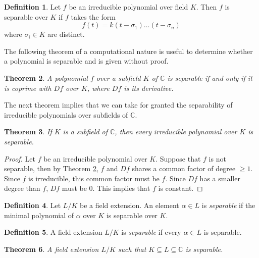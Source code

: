 \documentclass[12pt]{article}
\newtheorem{theorem}{Theorem}
\theoremstyle{definition}
\newtheorem{definition}[theorem]{Definition}
\newcommand{\C}{\mathbb C}
\begin{document}
\begin{definition}
    Let $f$ be an irreducible polynomial over field $K$. Then $f$ is separable over $K$ if $f$ takes the form 
    $$
        f(t) = k(t - \sigma_1) \dots (t - \sigma_n)
    $$
    where $\sigma_i \in \overline K$ are distinct.
\end{definition}

The following theorem of a computational nature is useful to determine whether a polynomial is separable and is given without proof. 

\begin{theorem} \label{thm:separable-derivative}
    A polynomial $f$ over a subfield $K$ of $\C$ is separable if and only if it is coprime with $Df$ over $K$, where $Df$ is its derivative. 
\end{theorem}

The next theorem implies that we can take for granted the separability of irreducible polynomials over subfields of $\C$. 

\begin{theorem} \label{thm:separable-poly-in-C}
    If $K$ is a subfield of $\C$, then every irreducible polynomial over $K$ is separable. 
\end{theorem}

\begin{proof}
    Let $f$ be an irreducible polynomial over $K$. Suppose that $f$ is not separable, then by Theorem \ref{thm:separable-derivative}, $f$ and $Df$ shares a common factor of degree $\ge 1$. Since $f$ is irreducible, this common factor must be $f$. Since $Df$ has a smaller degree than $f$, $Df$ must be $0$. This implies that $f$ is constant.
\end{proof}

\begin{definition}
    Let $L/K$ be a field extension. An element $\alpha \in L$ is \textit{separable} if the minimal polynomial of $\alpha$ over $K$ is separable over $K$.
\end{definition}

\begin{definition} \label{def:separable-extension}
    A field extension $L / K$ is \textit{separable} if every $\alpha \in L$ is separable.
\end{definition}

\begin{theorem}
    A field extension $L/K$ such that $K \subseteq L \subseteq \mathbb C$ is separable. 
\end{theorem}
\end{document}
